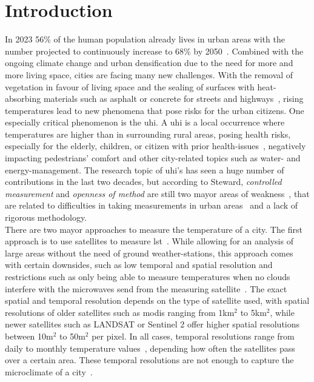 
\chapter{Introduction}
\label{chap:Introduction}

In 2023 56\% of the human population already lives in urban areas with the number projected to continuously  increase to 68\% by 2050~\cite{who2018projections}. Combined with the ongoing climate change and urban densification due to the need for more and more living space, cities are facing many new challenges. With the removal of vegetation in favour of living space and the sealing of surfaces with heat-absorbing materials such as asphalt or concrete for streets and highways~\cite{gret2020urban}, rising temperatures lead to new phenomena that pose risks for the urban citizens. One especially critical phenomenon is the \gls{uhi}. A \gls{uhi} is a local occurrence where temperatures are higher than in surrounding rural areas, posing health risks, especially for the elderly, children, or citizen with prior health-issues~\cite{martin2015alternative}, negatively impacting pedestrians' comfort and other city-related topics such as water- and energy-management. The research topic of \gls{uhi}'s has seen a huge number of contributions in the last two decades, but according to Steward, \textit{controlled measurement} and \textit{openness of method} are still two mayor areas of weakness~\cite{stewart2011systematic}, that are related to difficulties in taking measurements in urban areas~\cite{oke2006guideline} and a lack of rigorous methodology.\\
There are two mayor approaches to measure the temperature of a city. The first approach is to use satellites to measure \gls{lst}~\cite{peng2012surface}. While allowing for an analysis of large areas without the need of ground weather-stations, this approach comes with certain downsides, such as low temporal and spatial resolution and restrictions such as only being able to measure temperatures when no clouds interfere with the microwaves send from the measuring satellite~\cite{zhang2015estimation}. The exact spatial and temporal resolution depends on the type of satellite used, with spatial resolutions of older satellites such as \gls{modis} ranging from 1km$^2$ to 5km$^2$, while newer satellites such as LANDSAT or Sentinel 2 offer higher spatial resolutions between 10m$^2$ to 50m$^2$ per pixel. In all cases, temporal resolutions range from daily to monthly temperature values~\cite{ghent2022esalst}, depending how often the satellites pass over a certain area. These temporal resolutions are not enough to capture the microclimate of a city~\cite{voelkel2017towards}.\\
